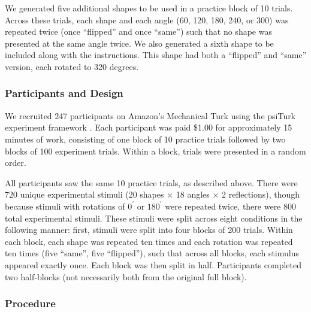 \documentclass[10pt,letterpaper]{article}
\begin{document}
We generated five additional shapes to be used in a practice block of
10 trials. Across these trials, each shape and each angle (60, 120,
180, 240, or 300) was repeated twice (once ``flipped'' and once
``same'') such that no shape was presented at the same angle twice. We
also generated a sixth shape to be included along with the
instructions.  This shape had both a ``flipped'' and ``same'' version,
each rotated to 320 degrees.


\subsubsection{Participants and Design}

We recruited 247 participants on Amazon's Mechanical Turk using the
psiTurk experiment framework \cite{Mcdonnell12}. Each participant was
paid \$1.00 for approximately 15 minutes of work, consisting of one
block of 10 practice trials followed by two blocks of 100 experiment
trials. Within a block, trials were presented in a random order.

All participants saw the same 10 practice trials, as described
above. There were 720 unique experimental stimuli (20 shapes $\times$
18 angles $\times$ 2 reflections), though because stimuli with
rotations of $0^\prime$ or $180^\prime$ were repeated twice, there
were 800 total experimental stimuli. These stimuli were split across
eight conditions in the following manner: first, stimuli were split
into four blocks of 200 trials. Within each block, each shape was
repeated ten times and each rotation was repeated ten times (five
``same'', five ``flipped''), such that across all blocks, each
stimulus appeared exactly once. Each block was then split in
half. Participants completed two half-blocks (not necessarily both
from the original full block).

\subsubsection{Procedure}
\end{document}
